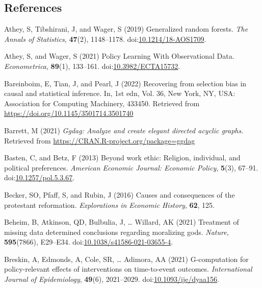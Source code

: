 \documentclass[
  singlecolumn,
  9pt]{article}
\newlength{\cslentryspacing}
\begin{document}
\subsection{References}\label{references}

\label{refs}
\setlength{\cslentryspacing}{0em}
\begin{CSLReferences}
Athey, S, Tibshirani, J, and Wager, S (2019) Generalized random forests.
\emph{The Annals of Statistics}, \textbf{47}(2), 1148--1178.
doi:\href{https://doi.org/10.1214/18-AOS1709}{10.1214/18-AOS1709}.

Athey, S, and Wager, S (2021) Policy Learning With Observational Data.
\emph{Econometrica}, \textbf{89}(1), 133--161.
doi:\href{https://doi.org/10.3982/ECTA15732}{10.3982/ECTA15732}.

Bareinboim, E, Tian, J, and Pearl, J (2022) Recovering from selection
bias in causal and statistical inference. In, 1st edn, Vol. 36, New
York, NY, USA: Association for Computing Machinery, 433450. Retrieved
from \url{https://doi.org/10.1145/3501714.3501740}

Barrett, M (2021) \emph{Ggdag: Analyze and create elegant directed
acyclic graphs}. Retrieved from
\url{https://CRAN.R-project.org/package=ggdag}

Basten, C, and Betz, F (2013) Beyond work ethic: Religion, individual,
and political preferences. \emph{American Economic Journal: Economic
Policy}, \textbf{5}(3), 67--91.
doi:\href{https://doi.org/10.1257/pol.5.3.67}{10.1257/pol.5.3.67}.

Becker, SO, Pfaff, S, and Rubin, J (2016) Causes and consequences of the
protestant reformation. \emph{Explorations in Economic History},
\textbf{62}, 125.

Beheim, B, Atkinson, QD, Bulbulia, J, \ldots{} Willard, AK (2021)
Treatment of missing data determined conclusions regarding moralizing
gods. \emph{Nature}, \textbf{595}(7866), E29--E34.
doi:\href{https://doi.org/10.1038/s41586-021-03655-4}{10.1038/s41586-021-03655-4}.

Breskin, A, Edmonds, A, Cole, SR, \ldots{} Adimora, AA (2021)
G-computation for policy-relevant effects of interventions on
time-to-event outcomes. \emph{International Journal of Epidemiology},
\textbf{49}(6), 2021--2029.
doi:\href{https://doi.org/10.1093/ije/dyaa156}{10.1093/ije/dyaa156}.


\end{CSLReferences}
\end{document}
